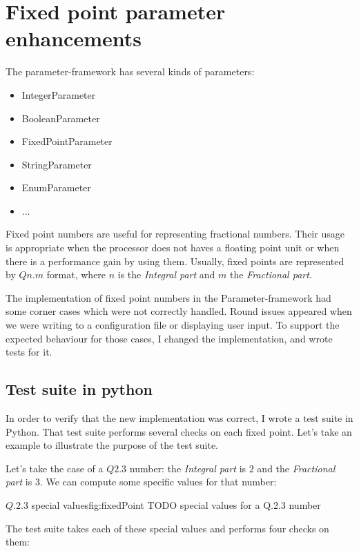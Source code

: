 \section{Fixed point parameter enhancements}
The parameter-framework has several kinds of parameters:
\begin{itemize}
    \item IntegerParameter
    \item BooleanParameter
    \item FixedPointParameter
    \item StringParameter
    \item EnumParameter
    \item ...
\end{itemize}

Fixed point numbers are useful for representing fractional numbers. Their
usage is appropriate when the processor does not haves a floating point unit
or when there is a performance gain by using them. Usually, fixed points are
represented by $Qn.m$ format, where $n$ is the \emph{Integral part} and $m$ the
\emph{Fractional part}.

The implementation of fixed point numbers in the Parameter-framework had some
corner cases which were not correctly handled. Round issues appeared when we
were writing to a configuration file or displaying user input. To
support the expected behaviour for those cases, I changed the implementation, and
wrote tests for it.

\subsection{Test suite in python}

In order to verify that the new implementation was correct, I wrote a test suite
in Python. That test suite performs several checks on each fixed point. Let's
take an example to illustrate the purpose of the test suite.

Let's take the case of a $Q2.3$ number: the \emph{Integral part} is $2$ and the
\emph{Fractional part} is $3$. We can compute some specific values for that number:

\begin{figureGraphics}{$Q.2.3$ special values}{fig:fixedPoint}
    TODO special values for a Q.2.3 number
\end{figureGraphics}

The test suite takes each of these special values and performs four checks on
them:

